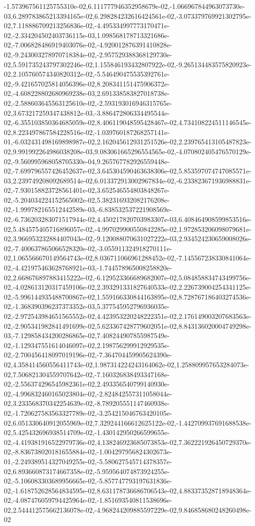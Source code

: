-1.573967561125755310e-02,6.111777946352958679e-02,-1.066967844963073730e-03,6.289783865213394165e-02,6.298284232616424561e-02,-3.073379769921302795e-02,7.118886709213256836e-02,-4.495334997773170471e-02,-2.334204502403736115e-03,1.098568178713321686e-02,-7.006828486919403076e-02,-4.920012876391410828e-02,-9.243003278970718384e-02,-2.957529388368129730e-02,5.591735243797302246e-02,1.155846193432807922e-02,-9.265134483575820923e-02,2.105760574340820312e-02,-5.546490475535392761e-02,-9.421657025814056396e-02,8.208341151475906372e-02,-4.608228802680969238e-03,2.691338583827018738e-02,-2.588603645563125610e-02,-2.593193016946315765e-02,3.673217259347438812e-03,-3.886472806334495544e-02,-6.355103850364685059e-02,8.406119048595428467e-02,4.734108224511146545e-02,8.223497867584228516e-02,-1.039760187268257141e-01,-6.032431498169898987e-02,2.162045612931251526e-02,2.239765413105487823e-02,9.991992264986038208e-03,9.083061665296554565e-02,-4.070802405476570129e-02,-9.560995968058705330e-04,9.265767782926559448e-02,-7.699796557426452637e-02,3.645304590463638306e-02,5.853597074747085571e-03,2.239749208092689514e-02,6.013372913002967834e-02,-6.233823671936988831e-02,-7.930158823728561401e-02,3.652546554803848267e-02,-5.204034224152565002e-02,5.382316932082176208e-02,-1.999782165512442589e-03,-6.838532537221908569e-02,-6.736203283071517944e-02,4.450217820703983307e-03,6.408464908599853516e-02,5.484575405716896057e-02,-4.997029900550842285e-02,1.972853206098079681e-02,3.966953232884407043e-02,-9.120088070631027222e-03,2.934524230659008026e-02,-7.400637865066528320e-02,-3.055911324918270111e-02,1.065566670149564743e-02,8.036711066961288452e-02,-7.145567238330841064e-02,-4.421975463628768921e-03,-1.744578965008258820e-02,2.668676897883415222e-02,-6.129523366689682007e-02,5.084858834743499756e-02,-4.028613120317459106e-02,2.393291331827640533e-02,2.226739004254341125e-02,-5.996144935488700867e-02,1.559166330844163895e-02,8.728767186403274536e-02,-1.368390396237373352e-03,5.377545952796936035e-02,-2.972543984651565552e-02,4.423953220248222351e-02,2.176149003207683563e-02,-2.905341982841491699e-02,5.623367428779602051e-02,8.843136020004749298e-03,-7.129858434200286865e-02,7.408244907855987549e-02,-1.129347551614046097e-02,2.198756299912929535e-02,-2.700456418097019196e-02,-7.364704459905624390e-02,4.358414560556411743e-02,1.987314224243164062e-02,1.258809957653284073e-02,7.506821304559707642e-02,-7.160326838493347168e-02,-2.556374296545982361e-02,2.493356540799140930e-02,-4.996832460165023804e-02,-2.824842557311058044e-02,3.233568370342254639e-02,-8.789205551147460938e-02,-1.720627583563327789e-02,-3.254215046763420105e-02,6.051330640912055969e-02,7.329244166612625122e-02,-1.442709937691688538e-02,5.425432696938514709e-02,-1.430142950266599655e-02,-4.419381916522979736e-02,4.138246923685073853e-02,7.362221926450729370e-02,-8.836738020181655884e-02,-1.004297956824302673e-01,-2.249389514327049255e-02,-5.580627545714378357e-02,6.893660873174667358e-02,-5.959564074873924255e-02,-5.106083303689956665e-02,-5.857747793197631836e-02,-1.618752628564834595e-02,8.631178736686706543e-02,4.883373528718948364e-02,-4.087476059794425964e-02,-1.851693540811538696e-02,2.544412575662136078e-02,-4.968244209885597229e-02,9.846858680248260498e-02
